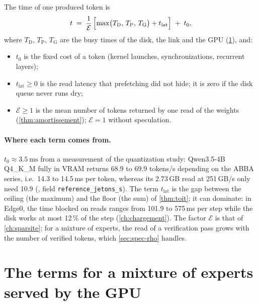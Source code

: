 \begin{definition}\label{def:equation-jeton}
The time of one produced token is
\begin{equation}\label{eq:jeton}
t \;=\; \frac{1}{\mathcal E}\,\Bigl[\max\bigl(T_{\mathrm{D}},\,T_{\mathrm{P}},\,T_{\mathrm{G}}\bigr) + t_{\mathrm{lat}}\Bigr] \;+\; t_0 ,
\end{equation}
where $T_{\mathrm{D}}$, $T_{\mathrm{P}}$, $T_{\mathrm{G}}$ are the busy times of the disk, the link and the GPU (\cref{sec:termes-moe}), and:
\begin{itemize}
\item $t_0$ is the fixed cost of a token (kernel launches, synchronizations, recurrent layers);
\item $t_{\mathrm{lat}} \ge 0$ is the read latency that prefetching did not hide; it is zero if the disk queue never runs dry;
\item $\mathcal E \ge 1$ is the mean number of tokens returned by one read of the weights (\cref{thm:amortissement}); $\mathcal E = 1$ without speculation.
\end{itemize}
\end{definition}

\paragraph{Where each term comes from.} $t_0 \approx \SI{3.5}{\milli\second}$ \calc{} from a measurement of the quantization study: Qwen3.5-4B Q4\_K\_M fully in VRAM returns 68.9 to 69.9 tokens/s depending on the ABBA series, i.e.\ 14.3 to 14.5\,ms per token, whereas its 2.73\,GB read at 251\,GB/s only need 10.9 (, field \texttt{reference\_jetons\_s}). The term $t_{\mathrm{lat}}$ is the gap between the ceiling (the maximum) and the floor (the sum) of \cref{thm:toit}; it can dominate: in Edge0, the time blocked on reads ranges from 101.9 to 575\,ms per step while the disk works at most 12\,\% of the step \litt{} (\cref{ch:chargement}). The factor $\mathcal E$ is that of \cref{ch:sparsite}; for a mixture of experts, the read of a verification pass grows with the number of verified tokens, which \cref{sec:spec-rho} handles.

\section{The terms for a mixture of experts served by the GPU}\label{sec:termes-moe}

